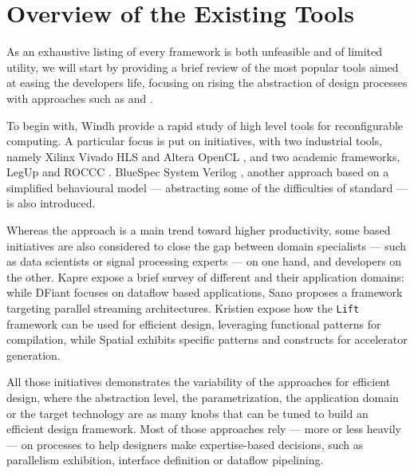 \newpage

\section{Overview of the Existing Tools}
\label{ch.state:seq.tools}

As an exhaustive listing of every  framework is both unfeasible and of limited utility, we will start by providing a brief review of the most popular tools aimed at easing the developers life, focusing on rising the abstraction of design processes with approaches such as  and .

To begin with, Windh \etal{} \cite{windh_high-level_2015} provide a rapid study of high level tools for reconfigurable computing.
A particular focus is put on  initiatives, with two industrial tools, namely Xilinx Vivado HLS \cite{zhang_autopilot_2008}\cite{xilinx_vivado_2021} and Altera OpenCL \cite{singh2011implementing}, and two academic frameworks, LegUp \cite{canis2011legup} and ROCCC \cite{villarreal_designing_2010}. 
BlueSpec System Verilog \cite{nikhil2008bluespec}, another approach based on a simplified behavioural model --- abstracting some of the difficulties of standard  --- is also introduced.

Whereas the  approach is a main trend toward higher productivity, some  based initiatives are also considered to close the gap between domain specialists --- such as data scientists or signal processing experts --- on one hand, and  developers on the other.
Kapre \etal{} \cite{kapre_survey_2016} expose a brief survey of different  and their application domains: while DFiant \cite{port_dfiant_2017} focuses on dataflow based applications, Sano \cite{sano_dsl-based_2015} proposes a framework targeting parallel streaming architectures. 
Kristien \etal{} \cite{kristien_high-level_2019} expose how the \texttt{Lift} framework can be used for efficient design, leveraging functional patterns for compilation, while Spatial \cite{koeplinger_spatial_2018} exhibits  specific patterns and constructs for accelerator generation.

All those initiatives demonstrates the variability of the approaches for efficient design, where the abstraction level, the parametrization, the application domain or the target technology are as many knobs that can be tuned to build an efficient design framework.
Most of those approaches rely --- more or less heavily --- on  processes to help designers make expertise-based decisions, such as parallelism exhibition, interface definition or dataflow pipelining.

